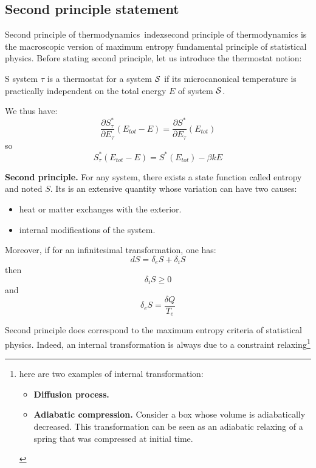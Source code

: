 \documentclass[12pt]{book}
\begin{document}
\subsection{Second principle statement}
Second principle of thermodynamics\
index{second principle of thermodynamics}
is the macroscopic version of maximum entropy fundamental
principle of statistical physics. Before stating second principle, let us
introduce the thermostat notion:
\begin{defn}
S system $\tau$ is a thermostat for a system $\cal S$ if its microcanonical
temperature is practically independent on the total energy $E$ of system $\cal
S$. 
\end{defn}
We thus have:
\begin{equation}
\frac {\partial S^*_{\tau}}{\partial E_{\tau}}(E_{tot}-E)=\frac
{\partial S^*}{\partial E_{\tau}}(E_{tot})
\end{equation}
so
\begin{equation}
S^*_{\tau}(E_{tot}-E)=S^*(E_{tot})-\beta k E
\end{equation}
\begin{postulat} {\bf Second principle.} For any system, there exists a state
  function called entropy and noted $S$. Its is an extensive quantity whose
  variation can have two causes:
\begin{itemize}
\item heat or matter exchanges with the exterior.
\item internal modifications of the system.
\end{itemize}
Moreover, if for an infinitesimal transformation, one has:
\begin{equation}
dS=\delta_eS+\delta_iS
\end{equation}
then
\begin{equation}
\delta_iS \geq 0
\end{equation}
and
\begin{equation}
\delta_eS =\frac{\delta Q}{T_e}
\end{equation}
\end{postulat}
\begin{rem} Second principle does correspond to the maximum entropy criteria
  of statistical physics. Indeed, an internal transformation is always due to
  a constraint relaxing\footnote{%
here are two examples of internal transformation:
\begin{itemize}
\item {\bf Diffusion process.} 
\item {\bf Adiabatic compression.}
Consider a box whose volume is adiabatically decreased. This transformation
can be seen as an adiabatic relaxing of a spring that was compressed at initial
time.
\end{itemize}}%
\end{rem}
\end{document}
